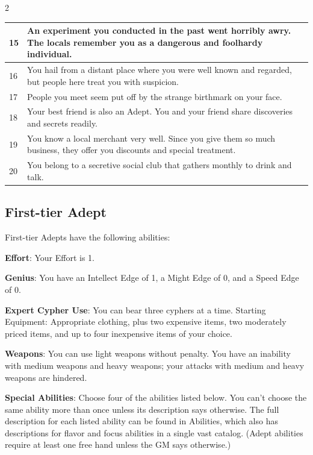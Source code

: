 \begin{multicols}{2}
\begin{table}
\begin{tabularx}{\textwidth}{| p{} | p{} |}
15 & An experiment you conducted in the past went horribly awry. The locals remember you as a dangerous and foolhardy individual. \\ \hline
16 & You hail from a distant place where you were well known and regarded, but people here treat you with suspicion. \\ \hline
17 & People you meet seem put off by the strange birthmark on your face. \\ \hline
18 & Your best friend is also an Adept. You and your friend share discoveries and secrets readily. \\ \hline
19 & You know a local merchant very well. Since you give them so much business, they offer you discounts and special treatment. \\ \hline
20 & You belong to a secretive social club that gathers monthly to drink and talk. \\ \hline

\end{tabularx}

\end{table}

\subsection{First-tier Adept}

First-tier Adepts have the following abilities:

\textbf{Effort}: Your Effort is 1. 

\textbf{Genius}: You have an Intellect Edge of 1, a Might Edge of 0, and a Speed Edge of 0. 

\textbf{Expert Cypher Use}: You can bear three cyphers at a time. 
Starting Equipment: Appropriate clothing, plus two expensive items, two moderately priced items, and up to four inexpensive items of your choice.

\textbf{Weapons}: You can use light weapons without penalty. You have an inability with medium weapons and heavy weapons; your attacks with medium and heavy weapons are hindered.

\textbf{Special Abilities}: Choose four of the abilities listed below. You can’t choose the same ability more than once unless its description says otherwise. The full description for each listed ability can be found in Abilities, which also has descriptions for flavor and focus abilities in a single vast catalog. (Adept abilities require at least one free hand unless the GM says otherwise.)


\end{multicols}
